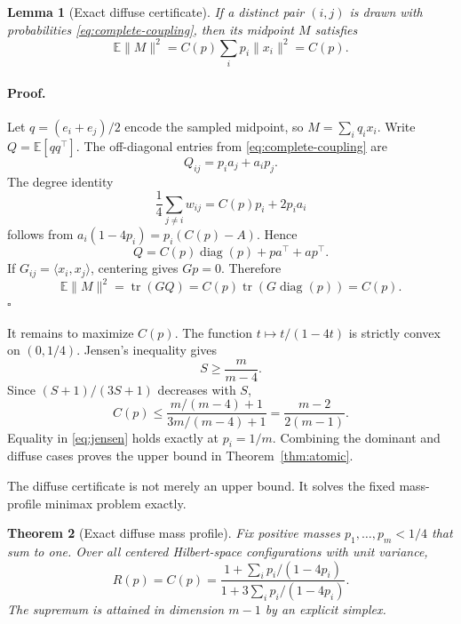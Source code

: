 \documentclass[twoside]{article}
\newtheorem{theorem}{Theorem}
\newtheorem{lemma}[theorem]{Lemma}
\newcommand{\E}{\mathbb E}
\begin{document}
\begin{lemma}[Exact diffuse certificate]\label{lem:diffuse}
If a distinct pair $(i,j)$ is drawn with probabilities \eqref{eq:complete-coupling}, then its midpoint $M$ satisfies
\begin{equation}\label{eq:exact-certificate}
 \E\|M\|^2=C(p)\sum_i p_i\|x_i\|^2=C(p).
\end{equation}
\end{lemma}

\paragraph{Proof.}
Let $q=(e_i+e_j)/2$ encode the sampled midpoint, so $M=\sum_i q_i x_i$. Write $Q=\E[qq^\top]$. The off-diagonal entries from \eqref{eq:complete-coupling} are \[ Q_{ij}=p_i a_j+a_i p_j. \] The degree identity \[ \frac14\sum_{j\ne i}w_{ij}=C(p)p_i+2p_i a_i \] follows from $a_i(1-4p_i)=p_i(C(p)-A)$. Hence
\begin{equation}\label{eq:Qidentity}
 Q=C(p)\operatorname{diag}(p)+pa^\top+ap^\top.
\end{equation}
If $G_{ij}=\langle x_i,x_j\rangle$, centering gives $Gp=0$. Therefore \[ \E\|M\|^2=\operatorname{tr}(GQ) =C(p)\operatorname{tr}(G\operatorname{diag}(p))=C(p). \] \hfill$\square$

It remains to maximize $C(p)$. The function $t\mapsto t/(1-4t)$ is strictly convex on $(0,1/4)$. Jensen's inequality gives
\begin{equation}\label{eq:jensen}
 S\geq\frac{m}{m-4}.
\end{equation}
Since $(S+1)/(3S+1)$ decreases with $S$,
\begin{equation}\label{eq:Cbound}
 C(p)\leq
 \frac{m/(m-4)+1}{3m/(m-4)+1}
 =\frac{m-2}{2(m-1)}.
\end{equation}
Equality in \eqref{eq:jensen} holds exactly at $p_i=1/m$. Combining the dominant and diffuse cases proves the upper bound in Theorem~\ref{thm:atomic}.

The diffuse certificate is not merely an upper bound. It solves the fixed mass-profile minimax problem exactly.

\begin{theorem}[Exact diffuse mass profile]\label{thm:profile}
Fix positive masses $p_1,\ldots,p_m<1/4$ that sum to one. Over all centered Hilbert-space configurations with unit variance,
\begin{equation}\label{eq:profile}
 R(p)=C(p)=
 \frac{1+\sum_i p_i/(1-4p_i)}
 {1+3\sum_i p_i/(1-4p_i)}.
\end{equation}
The supremum is attained in dimension $m-1$ by an explicit simplex.
\end{theorem}
\end{document}
